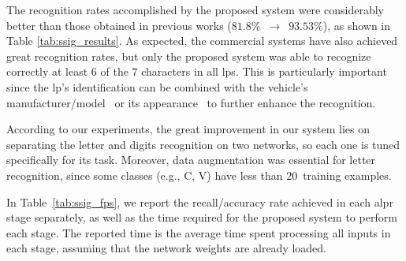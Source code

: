 The recognition rates accomplished by the proposed system were considerably better than those obtained in previous works ($81.8\%$~$\rightarrow$~$93.53\%$), as shown in Table \ref{tab:ssig_results}. As expected, the commercial systems have also achieved great recognition rates, but only the proposed system was able to recognize correctly at least $6$ of the $7$ characters in all \glspl*{lp}. 
This is particularly important since the \gls*{lp}'s identification can be combined with the vehicle's manufacturer/model~\cite{dlagnekov2005} or its appearance~\cite{goncalves2016} to further enhance the recognition.

\begin{table}[!htb]
	\centering
	\caption{Recognition rates obtained by the proposed \gls*{alpr} system, previous work and commercial systems in the \gls*{ssig} dataset.}
	\label{tab:ssig_results}
	{
		\renewcommand{\arraystretch}{1.1}
	}
\end{table}

According to our experiments, the great improvement in our system lies on separating the letter and digits recognition on two networks, so each one is tuned specifically for its task. Moreover, data augmentation was essential for letter recognition, since some classes (e.g., C, V) have less than $20$~training examples.

In Table~\ref{tab:ssig_fps}, we report the recall/accuracy rate achieved in each \gls*{alpr} stage separately, as well as the time required for the proposed system to perform each stage. The reported time is the average time spent processing all inputs in each stage, assuming that the network weights are already loaded.

